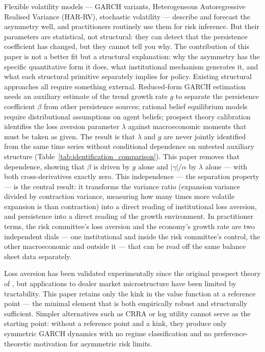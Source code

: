 \documentclass[12pt,a4paper]{article}
\theoremstyle{definition}
\begin{document}
Flexible volatility models --- GARCH variants, Heterogeneous
Autoregressive Realised Variance (HAR-RV), stochastic volatility ---
describe and forecast the asymmetry well, and practitioners routinely
use them for risk inference. But their parameters are statistical, not
structural: they can detect that the persistence coefficient has changed,
but they cannot tell you why. The contribution of this paper is not a
better fit but a structural explanation: why the asymmetry has the
specific quantitative form it does, what institutional mechanism
generates it, and what each structural primitive separately implies for
policy. Existing structural approaches all require something external.
Reduced-form GARCH estimation needs an auxiliary estimate of the trend
growth rate $g$ to separate the persistence coefficient $\beta$ from
other persistence sources; rational belief equilibrium models
\citep{brock1998,kurz2001} require distributional assumptions on agent
beliefs; prospect theory calibration \citep{barberis2001} identifies the
loss aversion parameter $\lambda$ against macroeconomic moments that
must be taken as given. The result is that $\lambda$ and $g$ are never
jointly identified from the same time series without conditional
dependence on untested auxiliary structure
(Table~\ref{tab:identification_comparison}). This paper removes that
dependence, showing that $\beta$ is driven by $g$ alone and
$|\gamma|/\alpha$ by $\lambda$ alone --- with both cross-derivatives
exactly zero. This independence --- the separation property --- is the
central result: it transforms the variance ratio (expansion variance
divided by contraction variance, measuring how many times more volatile
expansion is than contraction) into a direct reading of institutional
loss aversion, and persistence into a direct reading of the growth
environment. In practitioner terms, the risk committee's loss aversion
and the economy's growth rate are two independent dials --- one
institutional and inside the risk committee's control, the other
macroeconomic and outside it --- that can be read off the same balance
sheet data separately.

Loss aversion has been validated experimentally since the original
prospect theory of \citet{kahneman1979}, but applications to dealer
market microstructure have been limited by tractability. This paper
retains only the kink in the value function at a reference point --- the
minimal element that is both empirically robust and structurally
sufficient. Simpler alternatives such as CRRA or log utility cannot
serve as the starting point: without a reference point and a kink, they
produce only symmetric GARCH dynamics with no regime classification and
no preference-theoretic motivation for asymmetric risk limits.
\end{document}
